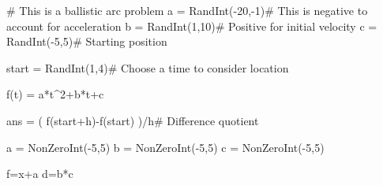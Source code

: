 \begin{sagesilent}
# This is a ballistic arc problem
a = RandInt(-20,-1)# This is negative to account for acceleration
b = RandInt(1,10)# Positive for initial velocity
c = RandInt(-5,5)# Starting position

start = RandInt(1,4)# Choose a time to consider location

f(t) = a*t^2+b*t+c

ans = ( f(start+h)-f(start) )/h# Difference quotient

\end{sagesilent}




%
%
%
%
%
%
%
%
%
%
%
%
%
%
%
%
%
%
%
%
%

\begin{sagesilent}
a = NonZeroInt(-5,5)
b = NonZeroInt(-5,5)
c = NonZeroInt(-5,5)

f=x+a
d=b*c
\end{sagesilent}

